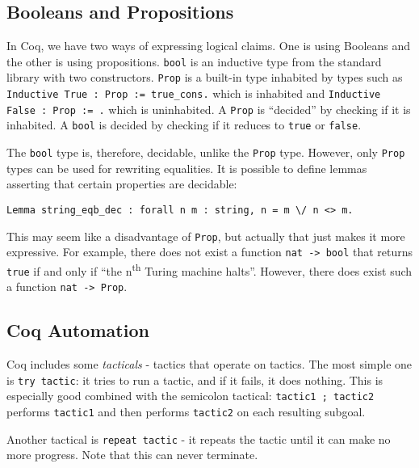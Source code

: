 \subsection{Booleans and Propositions}
In Coq, we have two ways of expressing logical claims. One is using Booleans and the other is using propositions. 
\lstinline{bool} is an inductive type from the standard library with two constructors. \lstinline{Prop} is a built-in
type inhabited by types such as \lstinline{Inductive True : Prop := true_cons.} which is inhabited and
\lstinline{Inductive False : Prop := .} which is uninhabited. A \lstinline{Prop} is ``decided'' by checking
if it is inhabited. A \lstinline{bool} is decided by checking if it reduces to \lstinline{true} or
\lstinline{false}.

The \lstinline{bool} type is, therefore, decidable, unlike the \lstinline{Prop} type. However, only \lstinline{Prop}
types can be used for rewriting equalities. It is possible to define lemmas asserting that certain properties
are decidable:
\begin{lstlisting}
Lemma string_eqb_dec : forall n m : string, n = m \/ n <> m.
\end{lstlisting}

This may seem like a disadvantage of \lstinline{Prop}, but actually that just makes it more expressive. For example,
there does not exist a function \lstinline{nat -> bool} that returns \lstinline{true} if and only if 
``the n\textsuperscript{th} Turing machine halts''. However, there does exist such a function \lstinline{nat -> Prop}.


\subsection{Coq Automation}

Coq includes some \emph{tacticals} - tactics that operate on tactics. The most simple one is \lstinline{try tactic}: it tries
to run a tactic, and if it fails, it does nothing. This is especially good combined with the semicolon tactical:
\lstinline{tactic1 ; tactic2} performs \lstinline{tactic1} and then performs \lstinline{tactic2} on each resulting
subgoal.

Another tactical is \lstinline{repeat tactic} - it repeats the tactic until it can make no more progress. Note that
this can never terminate.